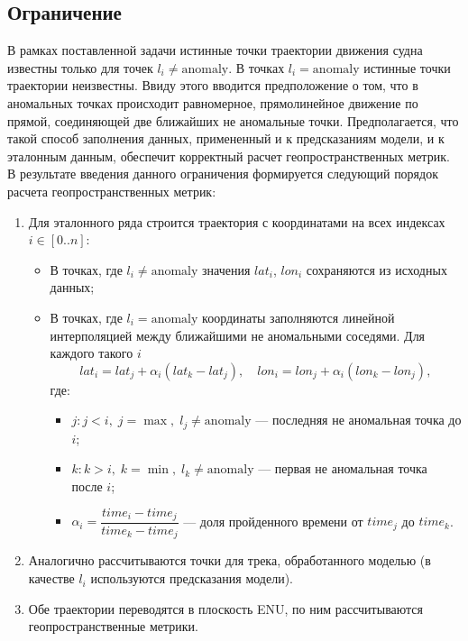 \documentclass[a4paper,12pt]{report}
\begin{document}
	\subsection{Ограничение}
	В рамках поставленной задачи истинные точки траектории движения судна известны только для точек $l_i \ne \mathrm{anomaly}$. В точках $l_i = \mathrm{anomaly}$ истинные точки траектории неизвестны. Ввиду этого вводится предположение о том, что в аномальных точках происходит равномерное, прямолинейное движение по прямой, соединяющей две ближайших не аномальные точки. Предполагается, что такой способ заполнения данных, примененный и к предсказаниям модели, и к эталонным данным, обеспечит корректный расчет геопространственных метрик. В результате введения данного ограничения формируется следующий порядок расчета геопространственных метрик:
	\begin{enumerate}
		\item Для эталонного ряда строится траектория с координатами на всех индексах $i \in [0..n]$:
			\begin{itemize}
				\item В точках, где $l_i \neq \mathrm{anomaly}$ значения $\mathit{lat}_i$, $\mathit{lon}_i$ сохраняются из исходных данных;
				\item В точках, где $l_i = \mathrm{anomaly}$ координаты заполняются линейной интерполяцией между ближайшими не аномальными соседями. Для каждого такого $i$
				\[
				\mathit{lat}_i = \mathit{lat}_j + \alpha_i(\mathit{lat}_k - \mathit{lat}_j), \quad \mathit{lon}_i = \mathit{lon}_j + \alpha_i(\mathit{lon}_k - \mathit{lon}_j),
				\]
				где:
				\begin{itemize}
					\item $j: j < i,\; j=\max,\; l_j \neq \mathrm{anomaly}$ --- последняя не аномальная точка до $i$;
					\item $k: k > i,\; k=\min,\; l_k \neq \mathrm{anomaly}$ --- первая не аномальная точка после $i$;
					\item $\alpha_i = \dfrac{time_i - time_j}{time_k - time_j}$ --- доля пройденного времени от $time_j$ до $time_k$.
				\end{itemize}
			\end{itemize}
		\item Аналогично рассчитываются точки для трека, обработанного моделью (в качестве $l_i$ используются предсказания модели).
		\item Обе траектории переводятся в плоскость ENU, по ним рассчитываются геопространственные метрики.
	\end{enumerate}
\end{document}
